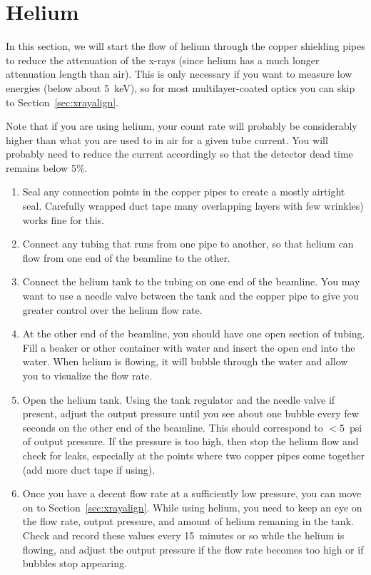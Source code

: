 \section{Helium\label{sec:he}}

In this section, we will start the flow of helium through the copper shielding
pipes to reduce the attenuation of the x-rays (since helium has a much longer
attenuation length than air). This is only necessary if you want to measure low
energies (below about 5~keV), so for most multilayer-coated optics you can skip
to Section~\ref{sec:xrayalign}.

Note that if you are using helium, your count rate will probably be considerably
higher than what you are used to in air for a given tube current. You will
probably need to reduce the current accordingly so that the detector dead time
remains below 5\%.

\begin{enumerate}

\item Seal any connection points in the copper pipes to create a mostly airtight
  seal. Carefully wrapped duct tape many overlapping layers with few wrinkles)
  works fine for this.

\item Connect any tubing that runs from one pipe to another, so that helium can
  flow from one end of the beamline to the other.

\item Connect the helium tank to the tubing on one end of the beamline. You may
  want to use a needle valve between the tank and the copper pipe to give you
  greater control over the helium flow rate.

\item At the other end of the beamline, you should have one open section of
  tubing. Fill a beaker or other container with water and insert the open end
  into the water. When helium is flowing, it will bubble through the water and
  allow you to visualize the flow rate.

\item Open the helium tank. Using the tank regulator and the needle valve if
  present, adjust the output pressure until you see about one bubble every few
  seconds on the other end of the beamline. This should correspond to $<5$~psi
  of output pressure. If the pressure is too high, then stop the helium flow and
  check for leaks, especially at the points where two copper pipes come together
  (add more duct tape if using).

\item Once you have a decent flow rate at a sufficiently low pressure, you can
  move on to Section~\ref{sec:xrayalign}. While using helium, you need to keep
  an eye on the flow rate, output pressure, and amount of helium remaning in the
  tank. Check and record these values every 15~minutes or so while the helium is
  flowing, and adjust the output pressure if the flow rate becomes too high or
  if bubbles stop appearing.

\end{enumerate}

